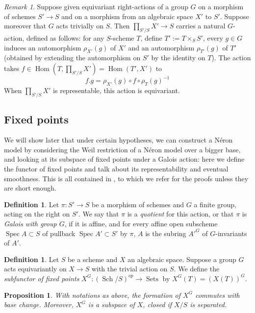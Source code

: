 \documentclass{article}
\DeclareMathOperator{\spec}{Spec}
\DeclareMathOperator{\sch}{Sch}
\DeclareMathOperator{\sets}{Sets}
\DeclareMathOperator{\Hom}{Hom}
\newtheorem{prop}[thm]{Proposition}
\theoremstyle{definition}
\newtheorem{defi}[thm]{Definition}
\theoremstyle{remark}
\newtheorem{rem}{Remark}[thm]
\begin{document}
\begin{rem}\label{remark G acts on the restriction}
Suppose given equivariant right-actions of a group $G$ on a morphism of schemes $S'\longrightarrow S$ and on a morphism from an algebraic space $X'$ to $S'$. Suppose moreover that $G$ acts trivially on $S$. Then $\prod\limits_{S'/S}X'\longrightarrow S$ carries a natural $G$-action, defined as follows: for any $S$-scheme $T$, define $T':=T\times_S S'$, every $g\in G$ induces an automorphism $\rho_{X'}(g)$ of $X'$ and an automorphism $\rho_{T'}(g)$ of $T'$ (obtained by extending the automorphism on $S'$ by the identity on $T$). The action takes $f\in\Hom(T,\prod\limits_{S'/S}X')=\Hom(T',X')$ to
\[
f.g=\rho_{X'}(g)\circ f\circ\rho_{T}(g)^{-1}
\]
When $\prod\limits_{S'/S}X'$ is representable, this action is equivariant.
\end{rem}

\subsection{Fixed points}

We will show later that under certain hypotheses, we can construct a N\'eron model by considering the Weil restriction of a N\'eron model over a bigger base, and looking at its subspace of fixed points under a Galois action: here we define the functor of fixed points and talk about its representability and eventual smoothness. This is all contained in \cite{TameRamification}, to which we refer for the proofs unless they are short enough.

\begin{defi}
Let $\pi\colon S'\longrightarrow S$ be a morphism of schemes and $G$ a finite group, acting on the right on $S'$. We say that $\pi$ is a \emph{quotient} for this action, or that $\pi$ is \emph{Galois with group $G$}, if it is affine, and for every affine open subscheme $\spec A\subset S$ of pullback $\spec A'\subset S'$ by $\pi$, $A$ is the subring $A'^G$ of $G$-invariants of $A'$.
\end{defi}

\begin{defi}
Let $S$ be a scheme and $X$ an algebraic space. Suppose a group $G$ acts equivariantly on $X\longrightarrow S$ with the trivial action on $S$. We define the \emph{subfunctor of fixed points} $X^G:(\sch/S)^{op}\longrightarrow\sets$ by $X^G(T)=(X(T))^G$.
\end{defi}

\begin{prop}
With notations as above, the formation of $X^G$ commutes with base change. Moreover, $X^G$ is a subspace of $X$, closed if $X/S$ is separated.
\end{prop}
\end{document}

